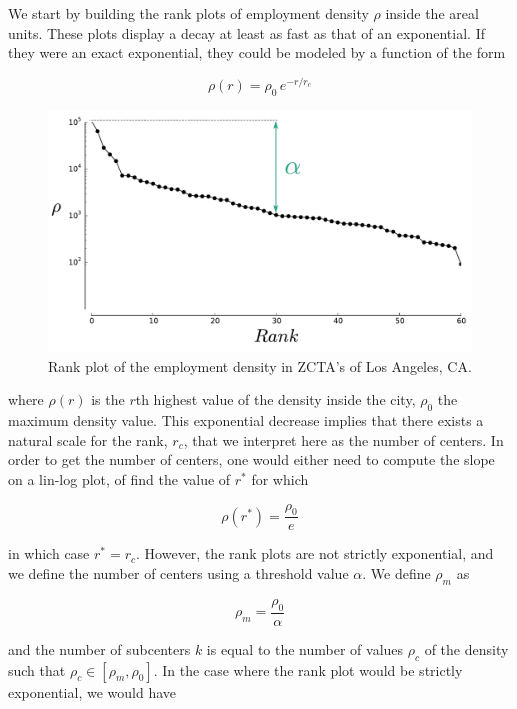 We start by building the rank plots of employment density $\rho$ inside the
areal units. These plots display a decay at least as fast as that of an
exponential. If they were an exact exponential, they could be modeled by a
function of the form

\begin{equation}
    \rho(r) = \rho_0\,e^{-r/r_c}
    \label{eq:}
\end{equation}

\begin{figure}
    \centering
    \includegraphics[width=1\textwidth]{gfx/chapter-monocentric/rank_plot_LA.pdf}
    \caption{Rank plot of the employment density in ZCTA's of Los Angeles, CA.
    \label{fig:rank_plot}}
\end{figure}

where $\rho(r)$ is the $r$th highest value of the density inside the city,
$\rho_0$ the maximum density value. This
exponential decrease implies that there exists a natural scale for the rank,
$r_c$, that we interpret here as the number of centers. In order to get the
number of centers, one would either need to compute the slope on a lin-log plot,
of find the value of $r^*$ for which

\begin{equation}
    \rho(r^*) = \frac{\rho_0}{e} 
\end{equation}

in which case $r^*=r_c$. However, the rank plots are not strictly exponential,
and we define the number of centers using a threshold value $\alpha$. We define
$\rho_m$ as 

\begin{equation}
    \rho_m = \frac{\rho_0}{\alpha}
\end{equation}

and the number of subcenters $k$ is equal to the number of values $\rho_c$ of
the density such that $\rho_c \in \left[ \rho_m, \rho_0 \right]$. In the case
where the rank plot would be strictly exponential, we would have


